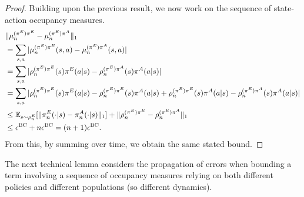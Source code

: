 \documentclass{article}
\begin{document}
\begin{proof}
Building upon the previous result, we now work on the sequence of state-action occupancy measures.
  \begin{align}
    &\|\mu_{n}^{(\pi^E)\pi^E} - \mu_{n}^{(\pi^E)\pi^A}\|_1
    \\&= \sum_{s,a} |\mu_{n}^{(\pi^E)\pi^E}(s,a) - \mu_{n}^{(\pi^E)\pi^A}(s,a)|
    \\
    &= \sum_{s,a} |\rho_{n}^{(\pi^E)\pi^E}(s) \pi^E(a|s) - \rho_{n}^{(\pi^E)\pi^A}(s)\pi^A(a|s)|
    \\
    &= \sum_{s,a} |\rho_{n}^{(\pi^E)\pi^E}(s) \pi^E(a|s) - \rho_{n}^{(\pi^E)\pi^E}(s) \pi^A(a|s) + \rho_{n}^{(\pi^E)\pi^E}(s) \pi^A(a|s) - \rho_{n}^{(\pi^E)\pi^A}(s)\pi^A(a|s)|
    \\
    &\leq \mathbb{E}_{s\sim \rho_n^E}[\|\pi_n^E(\cdot|s) - \pi_n^A(\cdot|s) \|_1] + \|\rho_{n}^{(\pi^E)\pi^E} - \rho_{n}^{(\pi^E)\pi^A}\|_1
    \\
    &\leq \epsilon^\mathrm{BC} + n \epsilon^\mathrm{BC} = (n+1) \epsilon^\mathrm{BC}. 
\end{align}
From this, by summing over time, we obtain the same stated bound.
\end{proof}

The next technical lemma considers the propagation of errors when bounding a term involving a sequence of occupancy measures relying on both different policies and different populations (so different dynamics).
\end{document}
